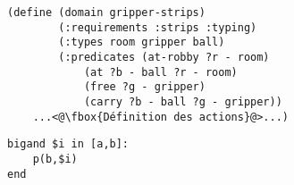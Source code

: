 \documentclass[a4paper,12pt,oneside]{article}
\begin{document}
\begin{lstlisting}[language=pddl,frame=single]
    (define (domain gripper-strips)
        (:requirements :strips :typing)
        (:types room gripper ball)
        (:predicates (at-robby ?r - room)
            (at ?b - ball ?r - room)
            (free ?g - gripper)
            (carry ?b - ball ?g - gripper))
    ...<@\fbox{Définition des actions}@>...)
\end{lstlisting}

\begin{lstlisting}[language=touist,frame=single]
bigand $i in [a,b]:
    p(b,$i)
end
\end{lstlisting}
\end{document}
